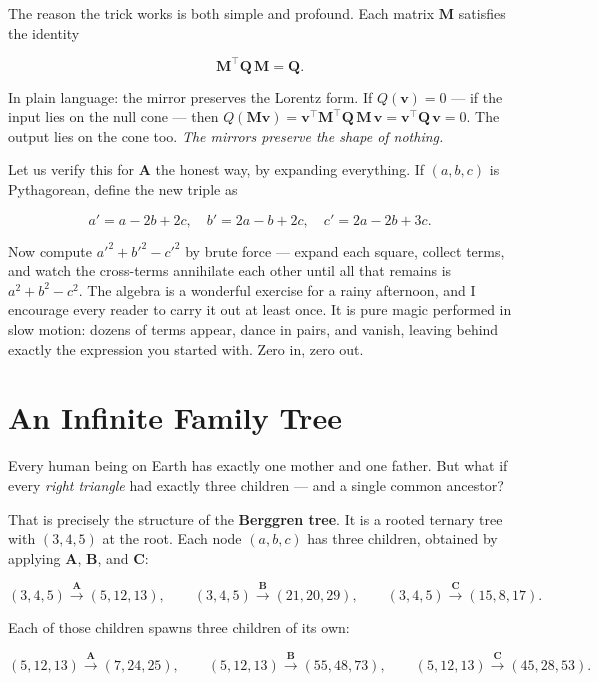 \documentclass[11pt,twoside,openright]{book}
\theoremstyle{definition}
\theoremstyle{remark}
\begin{document}
The reason the trick works is both simple and profound. Each matrix $\mathbf{M}$ satisfies the identity

\[\mathbf{M}^\top \mathbf{Q}\, \mathbf{M} = \mathbf{Q}.\]

In plain language: the mirror preserves the Lorentz form. If $Q(\mathbf{v}) = 0$ --- if the input lies on the null cone --- then $Q(\mathbf{M}\mathbf{v}) = \mathbf{v}^\top \mathbf{M}^\top \mathbf{Q}\, \mathbf{M}\, \mathbf{v} = \mathbf{v}^\top \mathbf{Q}\, \mathbf{v} = 0$. The output lies on the cone too. \textit{The mirrors preserve the shape of nothing.}

Let us verify this for $\mathbf{A}$ the honest way, by expanding everything. If $(a, b, c)$ is Pythagorean, define the new triple as

\[a' = a - 2b + 2c, \quad b' = 2a - b + 2c, \quad c' = 2a - 2b + 3c.\]

Now compute $a'^2 + b'^2 - c'^2$ by brute force --- expand each square, collect terms, and watch the cross-terms annihilate each other until all that remains is $a^2 + b^2 - c^2$. The algebra is a wonderful exercise for a rainy afternoon, and I encourage every reader to carry it out at least once. It is pure magic performed in slow motion: dozens of terms appear, dance in pairs, and vanish, leaving behind exactly the expression you started with. Zero in, zero out.



\section{An Infinite Family Tree}

Every human being on Earth has exactly one mother and one father. But what if every \textit{right triangle} had exactly three children --- and a single common ancestor?

That is precisely the structure of the \textbf{Berggren tree}. It is a rooted ternary tree with $(3, 4, 5)$ at the root. Each node $(a, b, c)$ has three children, obtained by applying $\mathbf{A}$, $\mathbf{B}$, and $\mathbf{C}$:

\[(3,4,5) \xrightarrow{\;\mathbf{A}\;} (5,12,13), \qquad
(3,4,5) \xrightarrow{\;\mathbf{B}\;} (21,20,29), \qquad
(3,4,5) \xrightarrow{\;\mathbf{C}\;} (15,8,17).\]

Each of those children spawns three children of its own:

\[(5,12,13) \xrightarrow{\;\mathbf{A}\;} (7,24,25), \qquad
(5,12,13) \xrightarrow{\;\mathbf{B}\;} (55,48,73), \qquad
(5,12,13) \xrightarrow{\;\mathbf{C}\;} (45,28,53).\]
\end{document}

